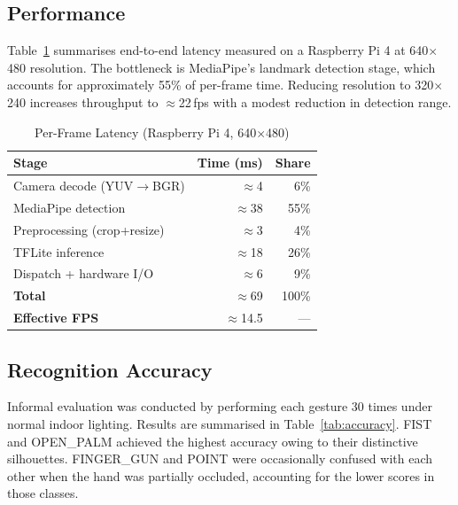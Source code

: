 \documentclass[sigconf, nonacm]{acmart}
\begin{document}
\subsection{Performance}

Table~\ref{tab:perf} summarises end-to-end latency measured on a Raspberry Pi 4 at 640$\times$480 resolution. The bottleneck is MediaPipe's landmark detection stage, which accounts for approximately 55\% of per-frame time. Reducing resolution to 320$\times$240 increases throughput to $\approx$22\,fps with a modest reduction in detection range.

\begin{table}[h]
\centering
\caption{Per-Frame Latency (Raspberry Pi 4, 640$\times$480)}
\label{tab:perf}
\begin{tabular}{lrr}
\toprule
\textbf{Stage}          & \textbf{Time (ms)} & \textbf{Share} \\
\midrule
Camera decode (YUV$\to$BGR) & $\approx$4      & 6\%  \\
MediaPipe detection         & $\approx$38     & 55\% \\
Preprocessing (crop+resize) & $\approx$3      & 4\%  \\
TFLite inference            & $\approx$18     & 26\% \\
Dispatch + hardware I/O     & $\approx$6      & 9\%  \\
\midrule
\textbf{Total}              & $\approx$69     & 100\% \\
\midrule
\textbf{Effective FPS}      & $\approx$14.5   & —    \\
\bottomrule
\end{tabular}
\end{table}

\subsection{Recognition Accuracy}

Informal evaluation was conducted by performing each gesture 30 times under normal indoor lighting. Results are summarised in Table~\ref{tab:accuracy}. FIST and OPEN\_PALM achieved the highest accuracy owing to their distinctive silhouettes. FINGER\_GUN and POINT were occasionally confused with each other when the hand was partially occluded, accounting for the lower scores in those classes.
\end{document}

